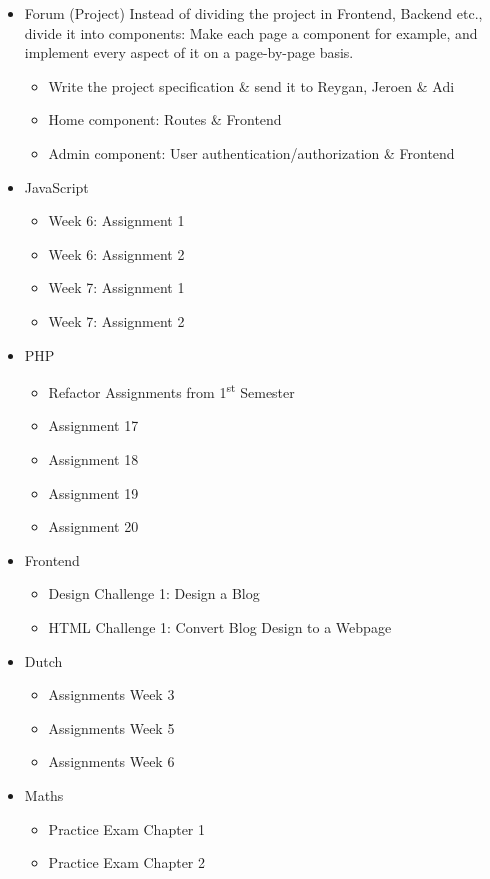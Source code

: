 \documentclass[12pt]{book}
\begin{document}
\begin{itemize}
  \item Forum (Project)
    Instead of dividing the project in Frontend, Backend etc., divide it into components:
    Make each page a component for example, and implement every aspect of it on a page-by-page
    basis.    
    \begin{itemize}
      \item Write the project specification \& send it to Reygan, Jeroen \& Adi
      \item Home component: Routes \& Frontend
      \item Admin component: User authentication/authorization \& Frontend
    \end{itemize}
  \item JavaScript
    \begin{itemize}
      \item Week 6: Assignment 1
      \item Week 6: Assignment 2
      \item Week 7: Assignment 1
      \item Week 7: Assignment 2
    \end{itemize}
  \item PHP
    \begin{itemize}
      \item Refactor Assignments from 1\textsuperscript{st} Semester
      \item Assignment 17
      \item Assignment 18
      \item Assignment 19
      \item Assignment 20
    \end{itemize}
  \item Frontend
      \begin{itemize}
        \item Design Challenge 1: Design a Blog
        \item HTML Challenge 1: Convert Blog Design to a Webpage
      \end{itemize}
  \item Dutch
    \begin{itemize}
      \item Assignments Week 3
      \item Assignments Week 5
      \item Assignments Week 6
    \end{itemize}
  \item Maths
    \begin{itemize}
      \item Practice Exam Chapter 1
      \item Practice Exam Chapter 2
    \end{itemize}
\end{itemize}
\end{document}
